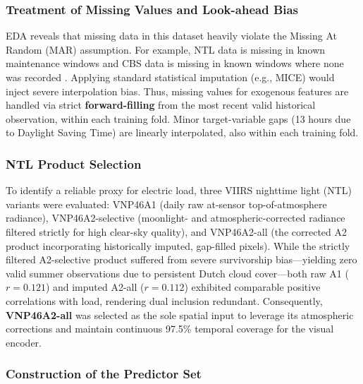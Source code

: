 \subsubsection{Treatment of Missing Values and Look-ahead Bias}
\label{subsubsec:missing_values}

EDA reveals that missing data in this dataset heavily violate the Missing At Random (MAR) assumption. For example, NTL data is missing in known maintenance windows \cite{nasa_viirs_vnp46a2} and CBS data is missing in known windows where none was recorded \cite{cbs_statline}. Applying standard statistical imputation (e.g., MICE) would inject severe interpolation bias. Thus, missing values for exogenous features are handled via strict \textbf{forward-filling} from the most recent valid historical observation, within each training fold. Minor target-variable gaps (13 hours due to Daylight Saving Time) are linearly interpolated, also within each training fold.

\subsubsection{NTL Product Selection}
\label{subsubsec:ntl_clarification}

To identify a reliable proxy for electric load, three VIIRS nighttime light (NTL) variants were evaluated: VNP46A1 (daily raw at-sensor top-of-atmosphere radiance), VNP46A2-selective (moonlight- and atmospheric-corrected radiance filtered strictly for high clear-sky quality), and VNP46A2-all (the corrected A2 product incorporating historically imputed, gap-filled pixels). While the strictly filtered A2-selective product suffered from severe survivorship bias—yielding zero valid summer observations due to persistent Dutch cloud cover—both raw A1 ($r = 0.121$) and imputed A2-all ($r = 0.112$) exhibited comparable positive correlations with load, rendering dual inclusion redundant. Consequently, \textbf{VNP46A2-all} was selected as the sole spatial input to leverage its atmospheric corrections and maintain continuous 97.5\% temporal coverage for the visual encoder.

\subsubsection{Construction of the Predictor Set}
\label{subsubsec:feature_set}

